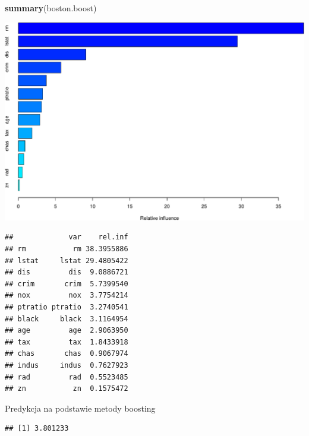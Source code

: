 \documentclass[
]{book}
\newenvironment{Shaded}{\begin{snugshade}}{\end{snugshade}}
\newcommand{\AttributeTok}[1]{\textcolor[rgb]{0.13,0.29,0.53}{#1}}
\newcommand{\DecValTok}[1]{\textcolor[rgb]{0.00,0.00,0.81}{#1}}
\newcommand{\FunctionTok}[1]{\textcolor[rgb]{0.13,0.29,0.53}{\textbf{#1}}}
\newcommand{\NormalTok}[1]{#1}
\newcommand{\OtherTok}[1]{\textcolor[rgb]{0.56,0.35,0.01}{#1}}
\newcommand{\SpecialCharTok}[1]{\textcolor[rgb]{0.81,0.36,0.00}{\textbf{#1}}}
\theoremstyle{plain}
\theoremstyle{definition}
\theoremstyle{definition}
\theoremstyle{definition}
\theoremstyle{definition}
\theoremstyle{definition}
\theoremstyle{remark}
\begin{document}
\begin{Shaded}
\begin{Highlighting}[]
\FunctionTok{summary}\NormalTok{(boston.boost)}
\end{Highlighting}
\end{Shaded}

\includegraphics{EksploracjaDanych_files/figure-latex/unnamed-chunk-43-1.pdf}

\begin{verbatim}
##             var    rel.inf
## rm           rm 38.3955886
## lstat     lstat 29.4805422
## dis         dis  9.0886721
## crim       crim  5.7399540
## nox         nox  3.7754214
## ptratio ptratio  3.2740541
## black     black  3.1164954
## age         age  2.9063950
## tax         tax  1.8433918
## chas       chas  0.9067974
## indus     indus  0.7627923
## rad         rad  0.5523485
## zn           zn  0.1575472
\end{verbatim}

Predykcja na podstawie metody boosting

\begin{Shaded}
\end{Shaded}

\begin{verbatim}
## [1] 3.801233
\end{verbatim}
\end{document}

